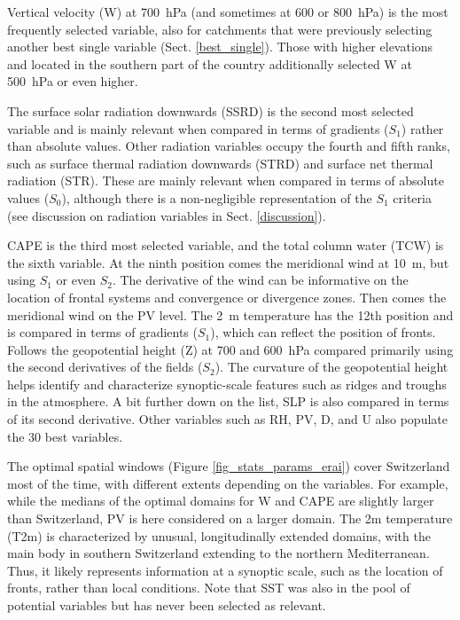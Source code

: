 \documentclass[draft]{agujournal2019}
\begin{document}
Vertical velocity (W) at 700~hPa (and sometimes at 600 or 800~hPa) is the most frequently selected variable, also for catchments that were previously selecting another best single variable (Sect. \ref{best_single}). Those with higher elevations and located in the southern part of the country additionally selected W at 500~hPa or even higher.

The surface solar radiation downwards (SSRD) is the second most selected variable and is mainly relevant when compared in terms of gradients ($S_{1}$) rather than absolute values. Other radiation variables occupy the fourth and fifth ranks, such as surface thermal radiation downwards (STRD) and surface net thermal radiation (STR). These are mainly relevant when compared in terms of absolute values ($S_{0}$), although there is a non-negligible representation of the $S_{1}$ criteria (see discussion on radiation variables in Sect. \ref{discussion}).

CAPE is the third most selected variable, and the total column water (TCW) is the sixth variable. At the ninth position comes the meridional wind at 10~m, but using $S_{1}$ or even $S_{2}$. The derivative of the wind can be informative on the location of frontal systems and convergence or divergence zones. Then comes the meridional wind on the PV level. The 2~m temperature has the 12th position and is compared in terms of gradients ($S_{1}$), which can reflect the position of fronts. Follows the geopotential height (Z) at 700 and 600~hPa compared primarily using the second derivatives of the fields ($S_{2}$). The curvature of the geopotential height helps identify and characterize synoptic-scale features such as ridges and troughs in the atmosphere. A bit further down on the list, SLP is also compared in terms of its second derivative. Other variables such as RH, PV, D, and U also populate the 30 best variables.

The optimal spatial windows (Figure \ref{fig_stats_params_erai}) cover Switzerland most of the time, with different extents depending on the variables. For example, while the medians of the optimal domains for W and CAPE are slightly larger than Switzerland, PV is here considered on a larger domain. The 2m temperature (T2m) is characterized by unusual, longitudinally extended domains, with the main body in southern Switzerland extending to the northern Mediterranean. Thus, it likely represents information at a synoptic scale, such as the location of fronts, rather than local conditions. Note that SST was also in the pool of potential variables but has never been selected as relevant.
\end{document}
